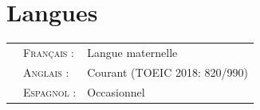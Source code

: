 \documentclass[a4paper,10pt]{article}
\begin{document}
\section{Langues}
\begin{flushleft}
\begin{tabular}{p{0.1cm}ll}
&\textsc{Français :}&Langue maternelle\\
&\textsc{Anglais :}&Courant (TOEIC 2018: 820/990)\\
&\textsc{Espagnol :}&Occasionnel
\end{tabular}
\end{flushleft}

\end{document}
